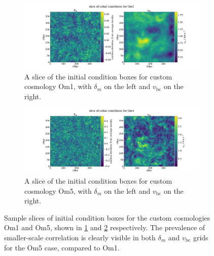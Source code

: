 \documentclass[floats,floatfix,showpacs,amssymb,prd,superscriptaddress,nofootinbib]{revtex4-2} %
\begin{document}
\begin{figure}[H]
     \centering
     \begin{subfigure}[b]{0.9\textwidth}
         \centering
         \includegraphics[width=\textwidth]{images/ic_grids/initial_condition_grid_Om1.png}
         \caption{A slice of the initial condition boxes for custom cosmology Om1, with $\delta_m$ on the left and $v_{\text{bc}}$ on the right.}
         \label{fig:IC_Om1}
     \end{subfigure}
     \hfill
     \begin{subfigure}[b]{0.9\textwidth}
         \centering
         \includegraphics[width=\textwidth]{images/ic_grids/initial_condition_grid_Om5.png}
         \caption{A slice of the initial condition boxes for custom cosmology Om5, with $\delta_m$ on the left and $v_{\text{bc}}$ on the right.}
         \label{fig:IC_Om5}
     \end{subfigure}
        \caption{Sample slices of initial condition boxes for the custom cosmologies Om1 and Om5, shown in \ref{fig:IC_Om1} and \ref{fig:IC_Om5} respectively. The prevalence of smaller-scale correlation is clearly visible in both $\delta_m$ and $v_{\text{bc}}$ grids for the Om5 case, compared to Om1.}
        \label{fig:IC_custom}
\end{figure}
\end{document}
